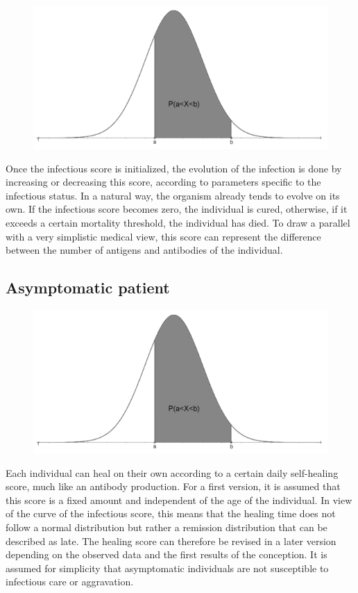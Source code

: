 \begin{figure}[h]
  \centering
  \includegraphics[width=0.5\linewidth]{Media/LoiGauss.png}
  \caption{}
  \label{fig:loigauss}
\end{figure}

\bigskip

Once the infectious score is initialized, the evolution of the infection is done by increasing or decreasing this score, according to parameters specific to the infectious status. In a natural way, the organism already tends to evolve on its own. If the infectious score becomes zero, the individual is cured, otherwise, if it exceeds a certain mortality threshold, the individual has died. To draw a parallel with a very simplistic medical view, this score can represent the difference between the number of antigens and antibodies of the individual.\\

\subsection{Asymptomatic patient}

\begin{figure}
  \centering
  \includegraphics[trim = 0 0 334 0, clip, width=\linewidth]{Media/LoiGauss.png}
\end{figure}

Each individual can heal on their own according to a certain daily self-healing score, much like an antibody production. For a first version, it is assumed that this score is a fixed amount and independent of the age of the individual. In view of the curve of the infectious score, this means that the healing time does not follow a normal distribution but rather a remission distribution that can be described as late. The healing score can therefore be revised in a later version depending on the observed data and the first results of the conception. It is assumed for simplicity that asymptomatic individuals are not susceptible to infectious care or aggravation.\\

